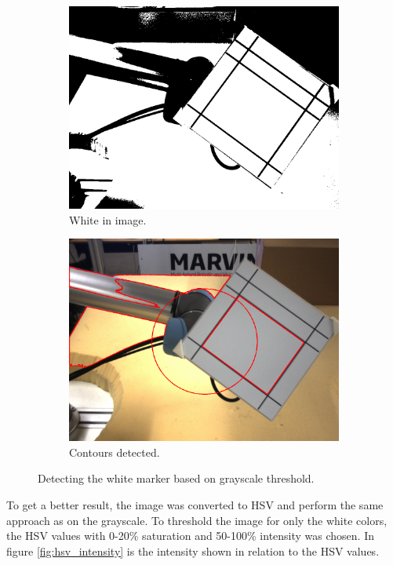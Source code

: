 \begin{figure}[H]
 \centering
 \begin{subfigure}{\exampleWidth}
 \includegraphics[width=\linewidth]{graphics/threshold_white}
 \caption{White in image.}
 \end{subfigure}
 \begin{subfigure}{\exampleWidth}
 \includegraphics[width=\linewidth]{graphics/threshold_white_contours}
 \caption{Contours detected.}
 \end{subfigure}
 \caption{Detecting the white marker based on grayscale threshold.}
 \label{fig:threshold_marker1}
\end{figure}

To get a better result, the image was converted to HSV and perform the same approach as on the grayscale.
To threshold the image for only the white colors, the HSV values with 
0-20\% saturation and 50-100\% intensity was chosen.
In figure \ref{fig:hsv_intensity} is the intensity shown in relation to the HSV values.

